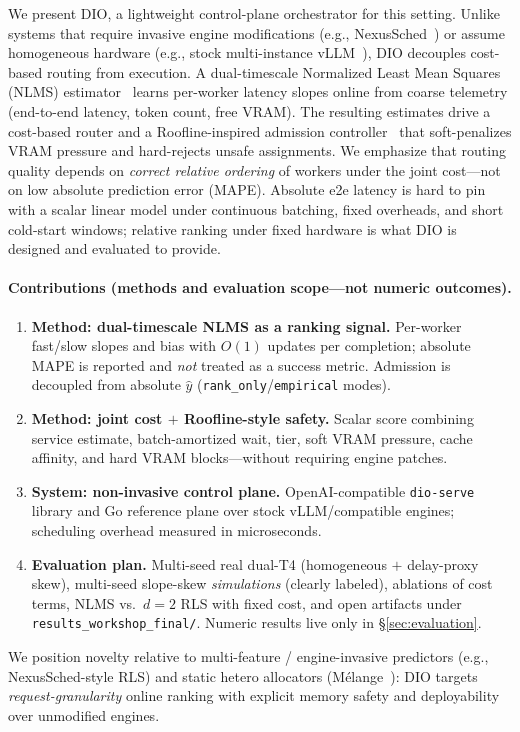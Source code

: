 \documentclass[10pt,twocolumn,letterpaper]{article}
\begin{document}
We present DIO, a lightweight control-plane orchestrator for this setting. Unlike systems that require invasive engine modifications (e.g., NexusSched~\cite{nexussched}) or assume homogeneous hardware (e.g., stock multi-instance vLLM~\cite{vllm}), DIO decouples cost-based routing from execution. A dual-timescale Normalized Least Mean Squares (NLMS) estimator~\cite{haykin2002adaptive} learns per-worker latency slopes online from coarse telemetry (end-to-end latency, token count, free VRAM). The resulting estimates drive a cost-based router and a Roofline-inspired admission controller~\cite{williams2009roofline} that soft-penalizes VRAM pressure and hard-rejects unsafe assignments. We emphasize that routing quality depends on \emph{correct relative ordering} of workers under the joint cost---not on low absolute prediction error (MAPE). Absolute e2e latency is hard to pin with a scalar linear model under continuous batching, fixed overheads, and short cold-start windows; relative ranking under fixed hardware is what DIO is designed and evaluated to provide.

\paragraph{Contributions (methods and evaluation scope---not numeric outcomes).}
\begin{enumerate}
    \item \textbf{Method: dual-timescale NLMS as a ranking signal.} Per-worker fast/slow slopes and bias with $O(1)$ updates per completion; absolute MAPE is reported and \emph{not} treated as a success metric. Admission is decoupled from absolute $\hat{y}$ (\texttt{rank\_only}/\texttt{empirical} modes).
    \item \textbf{Method: joint cost $+$ Roofline-style safety.} Scalar score combining service estimate, batch-amortized wait, tier, soft VRAM pressure, cache affinity, and hard VRAM blocks---without requiring engine patches.
    \item \textbf{System: non-invasive control plane.} OpenAI-compatible \texttt{dio-serve} library and Go reference plane over stock vLLM/compatible engines; scheduling overhead measured in microseconds.
    \item \textbf{Evaluation plan.} Multi-seed real dual-T4 (homogeneous $+$ delay-proxy skew), multi-seed slope-skew \emph{simulations} (clearly labeled), ablations of cost terms, NLMS vs.\ $d{=}2$ RLS with fixed cost, and open artifacts under \texttt{results\_workshop\_final/}. Numeric results live only in \S\ref{sec:evaluation}.
\end{enumerate}
We position novelty relative to multi-feature / engine-invasive predictors (e.g., NexusSched-style RLS) and static hetero allocators (M\'elange~\cite{melange}): DIO targets \emph{request-granularity} online ranking with explicit memory safety and deployability over unmodified engines.
\end{document}
